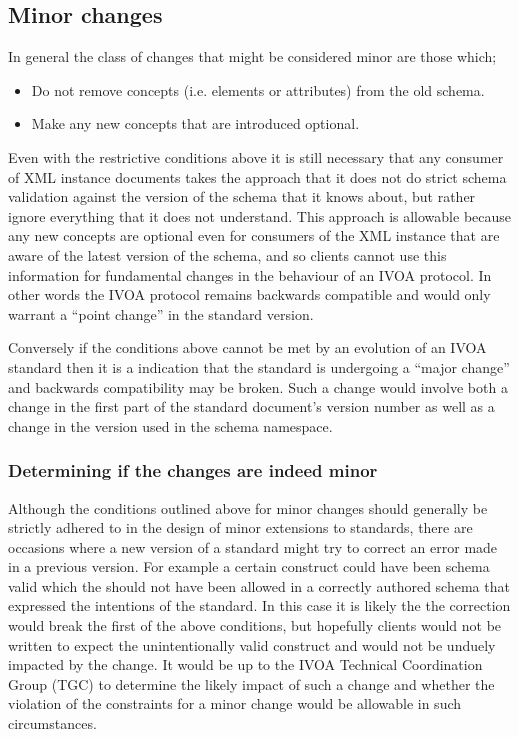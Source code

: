 \documentclass[10pt,a4paper]{ivoa}
\begin{document}
\subsection{Minor changes}
In general the class of changes that might be considered minor are those
which; 

\begin{itemize}
  \item Do not remove concepts (i.e. elements or attributes) from the old
  schema.
  \item Make any new concepts that are introduced optional.
\end{itemize}
Even with the restrictive conditions above it is still necessary that any
consumer of XML instance documents takes the approach that it does not do strict
schema validation against the version of the schema that it knows about, but
rather ignore everything that it does not understand. This approach is allowable
because any new concepts are optional even for consumers of the XML instance
that are aware of the latest version of the schema, and so clients cannot use
this information for fundamental changes in the behaviour of an IVOA protocol.
In other words the IVOA protocol remains backwards compatible and would only
warrant a ``point change'' in the standard version.

Conversely if the conditions above cannot be met by an evolution of an IVOA
standard then it is a indication that the standard is undergoing a ``major
change'' and backwards compatibility may be broken. Such a change would
involve both a change in the first part of the standard document's version
 number as well as a change in the version used in the schema
namespace.
\subsubsection{Determining if the changes are indeed minor}
Although the conditions outlined above for minor changes should generally be
strictly adhered to in the design of minor extensions to standards, there are
occasions where a new version of a standard might try to correct an error made
in a previous version. For example a certain construct could have been
schema valid which the should not have been allowed in a correctly authored
schema that expressed the intentions of the standard. In this case it is likely
the the correction would break the first of the above conditions, but hopefully
clients would not be written to expect the unintentionally valid construct and
would not be unduely impacted by the change. It would be up to the IVOA
Technical Coordination Group (TGC) to determine the likely impact of such a
change and whether the violation of the constraints for a minor change would be
allowable in such circumstances.
\end{document}
